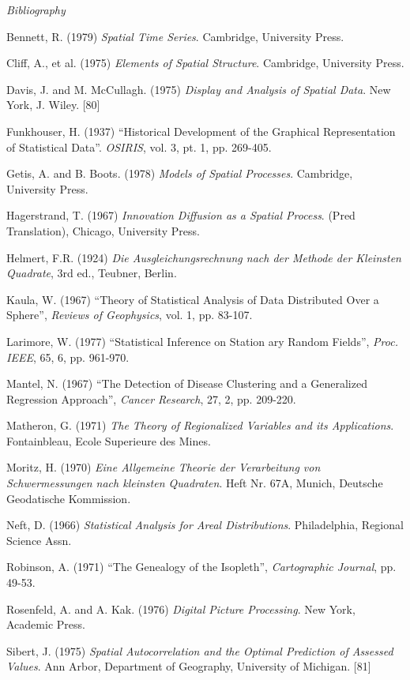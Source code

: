 \documentclass[a4paper,11pt]{article}
\begin{document}
{\parindent0pt
\emph{Bibliography}

\smallskip

Bennett, R. (1979) \emph{Spatial Time Series}. Cambridge, University Press.

Cliff, A., et al. (1975) \emph{Elements of Spatial Structure}. Cambridge, University Press.

Davis, J. and M. McCullagh. (1975) \emph{Display and Analysis of Spatial Data}. New York, J. Wiley. [80]

Funkhouser, H. (1937) ``Historical Development of the Graphical Representation of Statistical Data''. \emph{OSIRIS}, vol. 3, pt. 1, pp. 269-405.

Getis, A. and B. Boots. (1978) \emph{Models of Spatial Processes}. Cambridge, University Press.

Hagerstrand, T. (1967) \emph{Innovation Diffusion as a Spatial Process}. (Pred Translation), Chicago, University Press.

Helmert, F.R. (1924) \emph{Die Ausgleichungsrechnung nach der Methode der Kleinsten Quadrate}, 3rd ed., Teubner, Berlin.

Kaula, W. (1967) ``Theory of Statistical Analysis of Data Distributed Over a Sphere'', \emph{Reviews of Geophysics}, vol. 1, pp. 83-107.

Larimore, W. (1977) ``Statistical Inference on Station ary Random Fields'', \emph{Proc. IEEE}, 65, 6, pp. 961-970.

Mantel, N. (1967) ``The Detection of Disease Clustering and a Generalized Regression Approach'', \emph{Cancer Research}, 27, 2, pp. 209-220. 

Matheron, G. (1971) \emph{The Theory of Regionalized Variables and its Applications}. Fontainbleau, Ecole Superieure des Mines.

Moritz, H. (1970) \emph{Eine Allgemeine Theorie der Verarbeitung von Schwermessungen nach kleinsten Quadraten}. Heft Nr. 67A, Munich, Deutsche Geodatische Kommission.

Neft, D. (1966) \emph{Statistical Analysis for Areal Distributions}. Philadelphia, Regional Science Assn.

Robinson, A. (1971) ``The Genealogy of the Isopleth'', \emph{Cartographic Journal}, pp. 49-53.

Rosenfeld, A. and A. Kak. (1976) \emph{Digital Picture Processing}. New York, Academic Press.

Sibert, J. (1975) \emph{Spatial Autocorrelation and the Optimal Prediction of Assessed Values}. Ann Arbor, Department of Geography, University of Michigan. [81]

}
\end{document}
